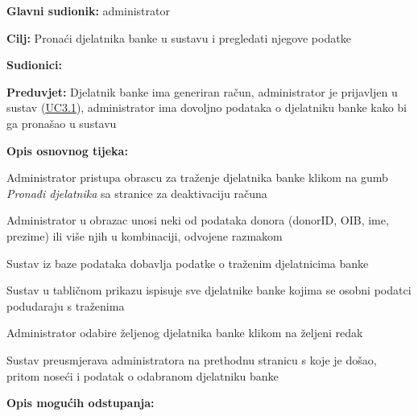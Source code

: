 					
					\noindent {}
					\begin{packed_item}  \label{UC4.2}
	
						\item \textbf{Glavni sudionik: }administrator
						\item  \textbf{Cilj:} Pronaći djelatnika banke u sustavu i pregledati njegove podatke
						\item  \textbf{Sudionici:} 
						\item  \textbf{Preduvjet:} Djelatnik banke ima generiran račun, administrator je prijavljen u sustav (\hyperref[UC3.1]{UC3.1}), administrator ima dovoljno podataka o djelatniku banke kako bi ga pronašao u sustavu
						\item  \textbf{Opis osnovnog tijeka:}
						
						\item[] \begin{packed_enum}
	                        \item Administrator pristupa obrascu za traženje djelatnika banke klikom na gumb \textit{Pronađi djelatnika} sa stranice za deaktivaciju računa
	                        \item Administrator u obrazac unosi neki od podataka donora (donorID, OIB, ime, prezime) ili više njih u kombinaciji, odvojene razmakom
	                        \item Sustav iz baze podataka dobavlja podatke o traženim djelatnicima banke
	                        \item Sustav u tabličnom prikazu ispisuje sve djelatnike banke kojima se osobni podatci podudaraju s traženima
	                        \item Administrator odabire željenog djelatnika banke klikom na željeni redak
	                        \item Sustav preusmjerava administratora na prethodnu stranicu s koje je došao, pritom noseći i podatak o odabranom djelatniku banke
						\end{packed_enum}
						
						\item  \textbf{Opis mogućih odstupanja:}
						\item[] \begin{packed_item}
	

\end{packed_item}
\end{packed_item}
